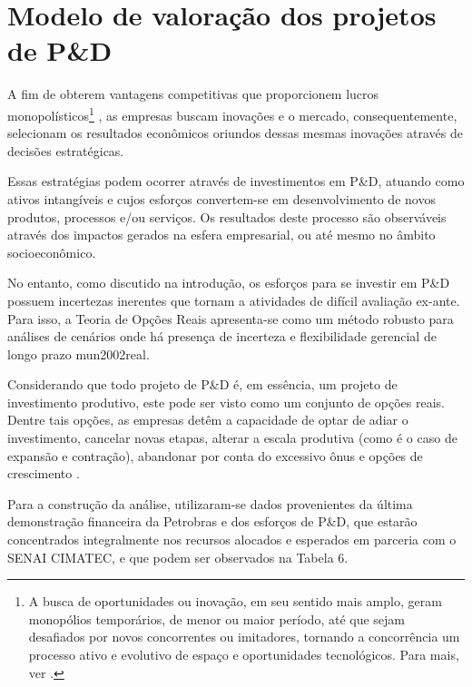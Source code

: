 \section{Modelo de valoração dos projetos de P\&D}
\label{sec:rskdesig}

A fim de obterem vantagens competitivas que proporcionem lucros monopolísticos\footnote{A busca de oportunidades ou inovação, em seu sentido mais amplo, geram monopólios temporários, de menor ou maior período, até que sejam desafiados por novos concorrentes ou imitadores, tornando a concorrência um processo ativo e evolutivo de espaço e oportunidades tecnológicos. Para mais, ver \cite{possas2002concorrencia}.} , as empresas buscam inovações e o mercado, consequentemente, selecionam os resultados econômicos oriundos dessas mesmas inovações através de decisões estratégicas. 

Essas estratégias podem ocorrer através de investimentos em P\&D, atuando como ativos intangíveis e cujos esforços convertem-se em desenvolvimento de novos produtos, processos e/ou serviços. Os resultados deste processo são observáveis através dos impactos gerados na esfera empresarial, ou até mesmo no âmbito socioeconômico. 

No entanto, como discutido na introdução, os esforços para se investir em P\&D possuem incertezas inerentes que tornam a atividades de difícil avaliação ex-ante. Para isso, a Teoria de Opções Reais apresenta-se como um método robusto para análises de cenários onde há presença de incerteza e flexibilidade gerencial de longo prazo \cite{dixit1994investment}{mun2002real}. 

Considerando que todo projeto de P\&D é, em essência, um projeto de investimento produtivo, este pode ser visto como um conjunto de opções reais. Dentre tais opções, as empresas detêm a capacidade de optar de adiar o investimento, cancelar novas etapas, alterar a escala produtiva (como é o caso de expansão e contração), abandonar por conta do excessivo ônus e opções de crescimento \cite{meirelles2004teoria}. 

Para a construção da análise, utilizaram-se dados provenientes da última demonstração financeira da Petrobras e dos esforços de P\&D, que estarão concentrados integralmente nos recursos alocados e esperados em parceria com o SENAI CIMATEC, e que podem ser observados na Tabela 6.

